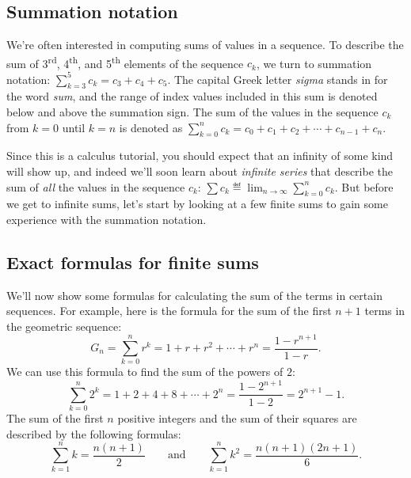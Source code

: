 \vspace{-4mm}	%

	\subsection{Summation notation}
	\label{sequences_and_series:summation_notation}

\vspace{-3mm}	%

		We're often interested in computing sums of values in a sequence.
		To describe the sum of 3\textsuperscript{rd}, 4\textsuperscript{th}, and 5\textsuperscript{th}
		elements of the sequence $c_k$,
		we turn to summation notation: $\sum_{k=3}^{5} c_k	= c_3 + c_4 + c_5$.
		The capital Greek letter \emph{sigma} stands in for the word \emph{sum}, 
		and the range of index values included in this sum is denoted below and above the summation sign.
		The sum of the values in the sequence $c_k$ from $k=0$ until $k=n$
		is denoted as $\sum_{k=0}^n c_k =  c_0 + c_1 + c_2 + \cdots + c_{n-1} + c_n$.

		Since this is a calculus tutorial,
		you should expect that an infinity of some kind will show up,
		and indeed we'll soon learn about \emph{infinite series}
		that describe the sum of \emph{all} the values in the sequence $c_k$:
		$\sum c_k  \eqdef 	\lim_{n \to \infty} \sum_{k=0}^n c_k$.
		But before we get to infinite sums,
		let's start by looking at a few finite sums
		to gain some experience with the summation notation.


	\subsection{Exact formulas for finite sums}

		We'll now show some formulas for calculating the sum of the terms in certain sequences.
		For example,
		here is the formula for the sum of the first $n+1$ terms in the geometric sequence:
		\[
			G_n = 
			\sum_{k=0}^n r^k 
				= 1 + r + r^2 + \cdots + r^n 
				= \frac{1-r^{n+1}}{1-r}.
		\]
		We can use this formula to find the sum of the powers of $2$:
		\[
		   \sum_{k=0}^n 2^k = 1 + 2 + 4 + 8 + \cdots + 2^n = \frac{1-2^{n+1}}{1-2} = 2^{n+1} -1.
		\]
		The sum of the first $n$ positive integers and the sum of their squares
		are described by the following formulas:
		\[
			\sum_{k=1}^n k = \frac{n(n+1)}{2}
			\qquad \text{and} \qquad
			\sum_{k=1}^n k^2=\frac{n(n+1)(2n+1)}{6}.
		\]

